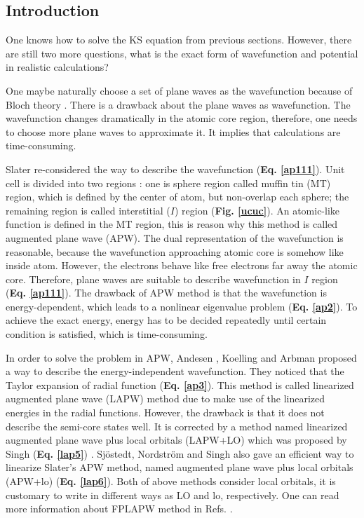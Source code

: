 \documentclass[a4paper, 12pt, titlepage,oneside,drop]{kthesis}
\begin{document}
\subsection{Introduction}

One knows how to solve the KS equation from previous sections. However, there are still two more questions, what is the exact form of 
wavefunction and potential in realistic calculations?  

One maybe naturally choose a set of plane waves as the wavefunction because of Bloch theory \cite{kittel1976introduction}. There is a drawback about the plane waves as wavefunction.
The wavefunction changes dramatically in the atomic core region, therefore, one needs to choose more plane
waves to approximate it. It implies that calculations are time-consuming.

Slater re-considered the way to describe the wavefunction (\textbf{Eq. \ref{ap111}}). Unit cell is divided into two regions \cite{slater1937wave,loucks1967augmented}: one is sphere region called muffin tin (MT) region, which is
defined by the center of atom, but non-overlap each sphere; the remaining region is called interstitial ($I$)
region (\textbf{Fig. \ref{ucuc}}). An atomic-like function is defined in the MT region, this is reason why this method is called augmented plane wave (APW).
The dual representation of the wavefunction is reasonable, because the wavefunction approaching atomic core is somehow like inside atom. However, the electrons behave like free electrons far away the atomic core.
Therefore, plane waves are suitable to describe wavefunction in $I$ region (\textbf{Eq. \ref{ap111}}). The drawback of APW method is that the wavefunction is energy-dependent, which leads to a 
nonlinear eigenvalue problem (\textbf{Eq. \ref{ap2}}). To achieve the exact energy, energy has to be decided repeatedly until certain condition is satisfied, which is time-consuming.

In order to solve the problem in APW, Andesen \cite{andersen1975linear}, Koelling and Arbman \cite{koelling1975use} proposed a way to describe the energy-independent wavefunction.
They noticed that the Taylor expansion of radial function (\textbf{Eq. \ref{ap3}}). This method is called linearized augmented plane wave (LAPW) method due to make use of the linearized energies in the radial functions. 
However, the drawback is that it does not describe the semi-core states well. It is corrected by a method named linearized augmented plane wave plus local orbitals (LAPW+LO) which was proposed by Singh (\textbf{Eq. \ref{lap5}}) \cite{singh1991ground}.
Sjöstedt, Nordström and Singh  \cite{sjostedt2000alternative} also gave an efficient way to linearize Slater's APW method, named augmented plane wave plus local orbitals (APW+lo) (\textbf{Eq. \ref{lap6}}). Both of above methods consider local orbitals, 
it is customary to write in different ways as LO and lo, respectively. One can read more information about FPLAPW method in Refs. \cite{nordstrom2006planewaves, excitingcode}.
\end{document}
